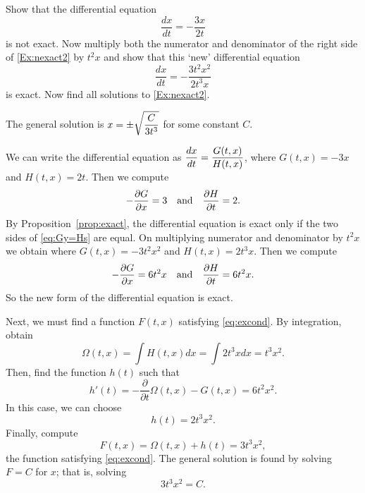 \documentclass{ximera}
\begin{document}
\begin{exercise}  \label{ex:if2}
Show that the differential equation
\begin{equation} \label{Ex:nexact2}
\frac{dx}{dt} = -\frac{3x}{2t}
\end{equation}
is not exact.  Now multiply both the numerator and denominator of the 
right side of \eqref{Ex:nexact2} by $t^2x$ and show that this `new' differential
equation 
\[
\frac{dx}{dt} = -\frac{3t^2x^2}{2t^3x}
\]
is exact.  Now find all solutions to \eqref{Ex:nexact2}.

\begin{solution}
\ans The general solution is $x = \displaystyle\pm\sqrt{\frac{C}{3t^3}}$ 
for some constant $C$.

\soln We can write the differential equation as $\displaystyle\frac{dx}{dt} =
\frac{G(t,x)}{H(t,x)}$, where $G(t,x) = -3x$ and $H(t,x) = 2t$. 
Then we compute
\[
-\frac{\partial G}{\partial x} = 3 \quad\mbox{and}\quad
\frac{\partial H}{\partial t} = 2.
\]
By Proposition~\ref{prop:exact}, the differential equation is exact only
if the two sides of \eqref{eq:Gy=Hs} are equal.
On multiplying numerator and denominator by $t^2x$ we obtain
where $G(t,x) = -3t^2x^2$ and $H(t,x) = 2t^3x$. 
Then we compute
\[
-\frac{\partial G}{\partial x} = 6t^2x \quad\mbox{and}\quad
\frac{\partial H}{\partial t} = 6t^2x.
\]
So the new form of the differential equation is exact.

Next, we must find a function $F(t,x)$ satisfying \eqref{eq:excond}.  By
integration, obtain
\[
\Omega(t,x) = \int H(t,x)dx = \int 2t^3xdx = t^3x^2.
\]
Then, find the function $h(t)$ such that
\[
h'(t) = -\frac{\partial}{\partial t}\Omega(t,x) - G(t,x)
= 6t^2x^2.
\]
In this case, we can choose 
\[
h(t) =  2t^3x^2.  
\]
Finally, compute
\[
F(t,x) = \Omega(t,x) + h(t) = 3t^3x^2,
\]
the function satisfying \eqref{eq:excond}.  The general solution is found by 
solving $F=C$ for $x$; that is, solving
\[
3t^3x^2 = C.
\]

\end{solution}
\end{exercise}
\end{document}
